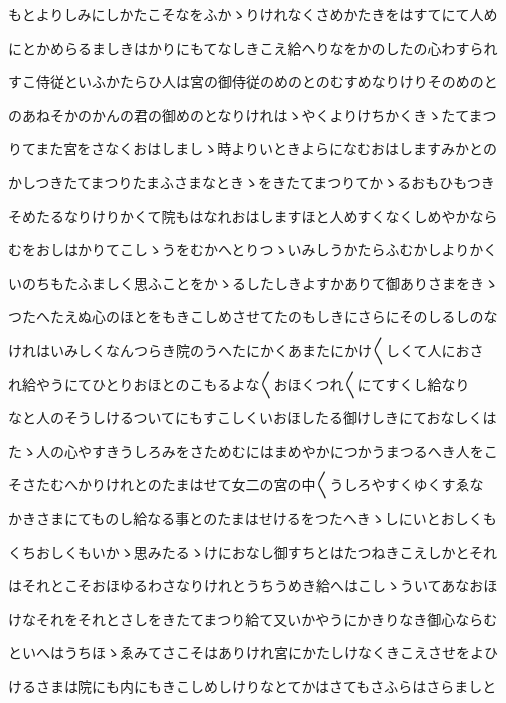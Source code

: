 \documentclass[a4paper,11pt,landscape]{ltjtarticle}
\begin{document}
\par\medskip
もとよりしみにしかたこそなをふかゝりけれなくさめかたきをはすてにて人め
\par\medskip
にとかめらるましきはかりにもてなしきこえ給へりなをかのしたの心わすられ
\par\medskip
すこ侍従といふかたらひ人は宮の御侍従のめのとのむすめなりけりそのめのと
\par\medskip
のあねそかのかんの君の御めのとなりけれはゝやくよりけちかくきゝたてまつ
\par\medskip
りてまた宮をさなくおはしましゝ時よりいときよらになむおはしますみかとの
\par\medskip
かしつきたてまつりたまふさまなときゝをきたてまつりてかゝるおもひもつき
\par\medskip
そめたるなりけりかくて院もはなれおはしますほと人めすくなくしめやかなら
\par\medskip
むをおしはかりてこしゝうをむかへとりつゝいみしうかたらふむかしよりかく
\par\medskip
いのちもたふましく思ふことをかゝるしたしきよすかありて御ありさまをきゝ
\par\medskip
つたへたえぬ心のほとをもきこしめさせてたのもしきにさらにそのしるしのな
\par\medskip
けれはいみしくなんつらき院のうへたにかくあまたにかけ〱しくて人におさ
\par\medskip
れ給やうにてひとりおほとのこもるよな〱おほくつれ〱にてすくし給なり
\par\medskip
なと人のそうしけるついてにもすこしくいおほしたる御けしきにておなしくは
\par\medskip
たゝ人の心やすきうしろみをさためむにはまめやかにつかうまつるへき人をこ
\par\medskip
そさたむへかりけれとのたまはせて女二の宮の中〱うしろやすくゆくすゑな
\par\medskip
かきさまにてものし給なる事とのたまはせけるをつたへきゝしにいとおしくも
\par\medskip
くちおしくもいかゝ思みたるゝけにおなし御すちとはたつねきこえしかとそれ
\par\medskip
はそれとこそおほゆるわさなりけれとうちうめき給へはこしゝういてあなおほ
\par\medskip
けなそれをそれとさしをきたてまつり給て又いかやうにかきりなき御心ならむ
\par\medskip
といへはうちほゝゑみてさこそはありけれ宮にかたしけなくきこえさせをよひ
\par\medskip
けるさまは院にも内にもきこしめしけりなとてかはさてもさふらはさらましと
\par\medskip
\end{document}
